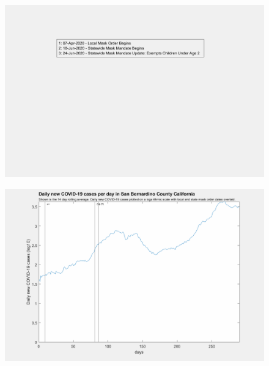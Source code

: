 \documentclass[]{article}
\begin{document}
\begin{figure}[!h]
	\includegraphics[width=\linewidth]{legends/san_bernardino_mask_order_legend.png}
	\caption{}
	\label{fig:legends/san_bernardino_mask_order_legendLabel}
\end{figure}

\begin{figure}[!h]
	\includegraphics[width=\linewidth]{images/san_bernardino_mask_order_log.png}
	\caption{}
	\label{fig:images/san_bernardino_mask_order_logLabel}
\end{figure}
\end{document}
